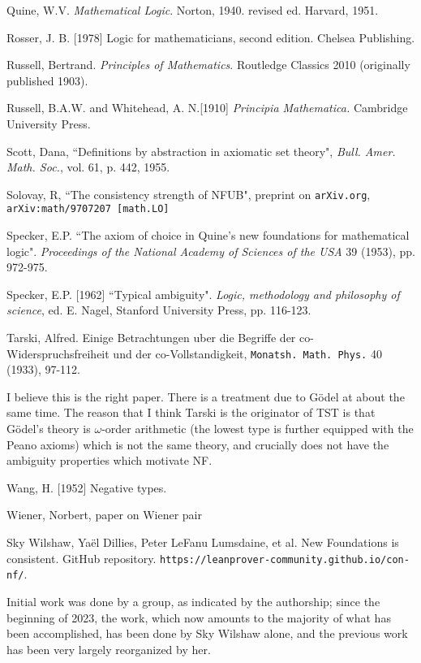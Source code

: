 \documentclass[112pt]{article}
\theoremstyle{definition}
\theoremstyle{remark}
\begin{document}
\begin{thebibliography}{99}
  Quine, W.V.  {\em Mathematical Logic\/}.  Norton, 1940.  revised ed. Harvard, 1951.

  Rosser, J. B. [1978]
Logic for mathematicians, second edition.
Chelsea Publishing.

  Russell, Bertrand.  {\em Principles of Mathematics\/}.  Routledge Classics 2010 (originally published 1903).

  Russell, B.A.W. and Whitehead, A. N.[1910]
{\em Principia Mathematica.\/} Cambridge University Press.

  Scott, Dana, ``Definitions by abstraction in axiomatic set theory",  {\em Bull. Amer. Math.
Soc.}, vol. 61, p. 442, 1955.

  Solovay, R, ``The consistency strength of NFUB",  preprint on {\tt arXiv.org}, {\tt arXiv:math/9707207 [math.LO]}

  Specker, E.P.
``The axiom of choice in Quine's new foundations for mathematical logic".
{\em Proceedings of the National Academy of Sciences of the USA\/} 39 (1953), pp. 972-975.

  Specker, E.P. [1962]
``Typical ambiguity".
{\em Logic, methodology and philosophy of science\/}, ed. E. Nagel, Stanford University Press, pp. 116-123.

  Tarski, Alfred.  Einige Betrachtungen uber die Begriffe der co-Widerspruchsfreiheit und der co-Vollstandigkeit,
{\tt Monatsh. Math. Phys.\/} 40 (1933), 97-112.

I believe this is the right paper.  There is a treatment due to G\"odel at about the same time.  The reason that I think Tarski is the originator of TST is that G\"odel's theory is $\omega$-order arithmetic (the lowest type is further equipped with the Peano axioms) which is not the same theory, and crucially does not have the ambiguity properties which motivate NF.

  Wang, H. [1952]
Negative types.

  Wiener, Norbert, paper on Wiener pair

  Sky Wilshaw, Yaël Dillies, Peter LeFanu Lumsdaine, et al. New Foundations is consistent. GitHub repository. {\tt https://leanprover-community.github.io/con-nf/}.

Initial work was done by a group, as indicated by the authorship;  since the beginning of 2023, the work, which now amounts to the majority of what has been accomplished, has been done by Sky Wilshaw alone, and the previous work has been very largely reorganized by her.


\end{thebibliography}
\end{document}
